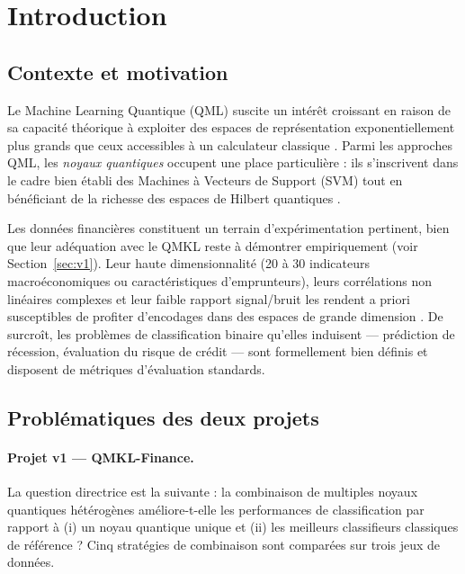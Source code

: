 \documentclass[12pt,a4paper]{article}
\begin{document}
\tableofcontents
\newpage

\section{Introduction}
\label{sec:intro}

\subsection{Contexte et motivation}

Le Machine Learning Quantique (QML) suscite un intérêt croissant en raison de
sa capacité théorique à exploiter des espaces de représentation exponentiellement
plus grands que ceux accessibles à un calculateur classique
\cite{biamonte2017,havlicek2019}.
Parmi les approches QML, les \emph{noyaux quantiques} occupent une place
particulière : ils s'inscrivent dans le cadre bien établi des Machines à Vecteurs
de Support (SVM) tout en bénéficiant de la richesse des espaces de Hilbert
quantiques \cite{schuld2021}.

Les données financières constituent un terrain d'expérimentation pertinent,
bien que leur adéquation avec le QMKL reste à démontrer empiriquement
(voir Section~\ref{sec:v1}).
Leur haute dimensionnalité (20 à 30 indicateurs macroéconomiques ou
caractéristiques d'emprunteurs), leurs corrélations non linéaires complexes
et leur faible rapport signal/bruit les rendent a priori susceptibles
de profiter d'encodages dans des espaces de grande dimension \cite{ibm_hsbc_2023}.
De surcroît, les problèmes de classification binaire qu'elles induisent —
prédiction de récession, évaluation du risque de crédit — sont formellement
bien définis et disposent de métriques d'évaluation standards.

\subsection{Problématiques des deux projets}

\paragraph{Projet v1 — QMKL-Finance.}
La question directrice est la suivante : la combinaison de multiples noyaux
quantiques hétérogènes améliore-t-elle les performances de classification
par rapport à (i) un noyau quantique unique et (ii) les meilleurs classifieurs
classiques de référence ?
Cinq stratégies de combinaison sont comparées sur trois jeux de données.
\end{document}
